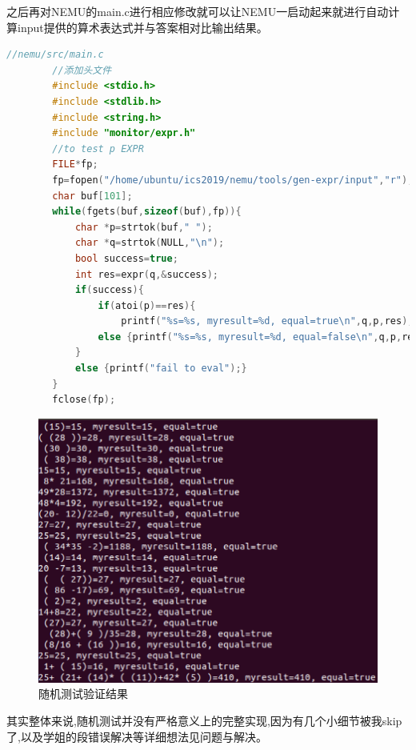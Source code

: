 \documentclass[UTF8,a4paper,10pt]{ctexart}
\begin{document}
{    之后再对NEMU的main.c进行相应修改就可以让NEMU一启动起来就进行自动计算input提供的算术表达式并与答案相对比输出结果。
    \begin{lstlisting}[title=随机测试,frame=trbl,language={C++}]
        //nemu/src/main.c
        //添加头文件
        #include <stdio.h>
        #include <stdlib.h>
        #include <string.h>
        #include "monitor/expr.h"
        //to test p EXPR
        FILE*fp;
        fp=fopen("/home/ubuntu/ics2019/nemu/tools/gen-expr/input","r");
        char buf[101];
        while(fgets(buf,sizeof(buf),fp)){
            char *p=strtok(buf," ");
            char *q=strtok(NULL,"\n");
            bool success=true;
            int res=expr(q,&success);
            if(success){
                if(atoi(p)==res){
                    printf("%s=%s, myresult=%d, equal=true\n",q,p,res);}
                else {printf("%s=%s, myresult=%d, equal=false\n",q,p,res);}
            }
            else {printf("fail to eval");}
        } 
        fclose(fp); 
    \end{lstlisting}
    \begin{figure}[H]
        \centering
        \includegraphics[scale=0.45]{fig/10.png}
        \caption{随机测试验证结果}
    \end{figure}

    其实整体来说,随机测试并没有严格意义上的完整实现,因为有几个小细节被我skip了,以及学姐的段错误解决等详细想法见问题与解决。

}
\end{document}
